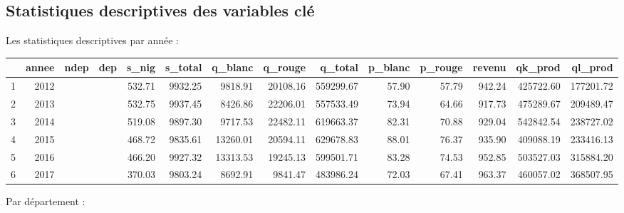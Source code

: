 \documentclass[11pt, a4paper]{article}
\begin{document}
\subsection*{Statistiques descriptives des variables clé}
Les statistiques descriptives par année :
\FloatBarrier
\begin{center}
\begin{table}
\begin{tabular}{rrrrrrrrrrrrrr}
  \hline
 & annee & ndep & dep & s\_nig & s\_total & q\_blanc & q\_rouge & q\_total & p\_blanc & p\_rouge & revenu & qk\_prod & ql\_prod \\ 
  \hline
1 & 2012 &  &  & 532.71 & 9932.25 & 9818.91 & 20108.16 & 559299.67 & 57.90 & 57.79 & 942.24 & 425722.60 & 177201.72 \\ 
  2 & 2013 &  &  & 532.75 & 9937.45 & 8426.86 & 22206.01 & 557533.49 & 73.94 & 64.66 & 917.73 & 475289.67 & 209489.47 \\ 
  3 & 2014 &  &  & 519.08 & 9897.30 & 9717.53 & 22482.11 & 619663.37 & 82.31 & 70.88 & 929.04 & 542842.54 & 238727.02 \\ 
  4 & 2015 &  &  & 468.72 & 9835.61 & 13260.01 & 20594.11 & 629678.83 & 88.01 & 76.37 & 935.90 & 409088.19 & 233416.13 \\ 
  5 & 2016 &  &  & 466.20 & 9927.32 & 13313.53 & 19245.13 & 599501.71 & 83.28 & 74.53 & 952.85 & 503527.03 & 315884.20 \\ 
  6 & 2017 &  &  & 370.03 & 9803.24 & 8692.91 & 9841.47 & 483986.24 & 72.03 & 67.41 & 963.37 & 460057.02 & 368507.95 \\ 
   \hline
\end{tabular}
\end{table}
\end{center}
\FloatBarrier
Par département :
\end{document}
